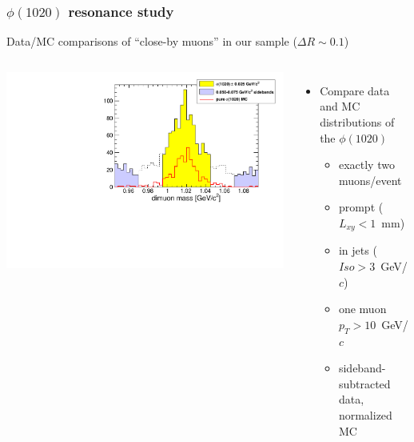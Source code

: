 \documentclass[compress]{beamer}
\begin{document}
\begin{frame}
\frametitle{$\phi(1020)$ resonance study}
\label{page:phi_study}

Data/MC comparisons of ``close-by muons'' in our sample ($\Delta R \sim 0.1$)

\begin{columns}

\includegraphics[width=\linewidth]{phi_mass.pdf}

\begin{itemize}
\item Compare data and MC distributions of the $\phi(1020)$
\begin{itemize}
\item exactly two muons/event
\item prompt ($L_{xy} < 1$~mm)
\item in jets ($Iso > 3$~GeV/$c$)
\item one muon $p_T > 10$~GeV/$c$
\item sideband-subtracted data, normalized MC
\end{itemize}
\end{itemize}
\end{columns}


\end{frame}
\end{document}
